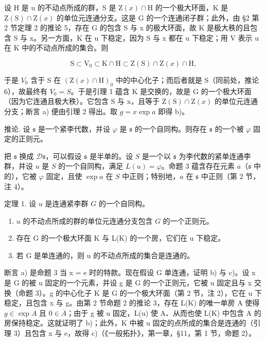 设 H 是 u 的不动点所成的群，S 是 \(\mathrm{Z}(x)\cap\mathrm{H}\) 的一个极大环面，K 是 \(\mathrm{Z}(\mathrm{S})\cap\mathrm{Z}(x)\) 的单位元连通分支。这是 G 的一个连通闭子群；此外，由 §2 第 2 节定理 2 的推论 5，存在 G 的包含 S 与 x 的极大环面，故 K 是极大秩的且包含 S 与 x。另一方面，K 在 u 下稳定，因为 S 与 x 都在 u 下稳定；用 V 表示 u 在 K 中的不动点所成的集合。则

\[
\mathrm{S} \subset \mathrm{V} _ {0} \subset \mathrm{K} \cap \mathrm{H} \subset \mathrm{Z} (\mathrm{S}) \cap \mathrm{Z} (x) \cap \mathrm{H},
\]

于是 \(V_{0}\) 含于 S 在 \((\mathrm{Z}(x)\cap\mathrm{H})_{0}\) 中的中心化子；而后者就是 S（同前处，推论 6），故最终有 \(V_{0}=S\)。于是引理 1 蕴含 K 是交换的，故是 G 的一个极大环面（因为它连通且极大秩）。它包含 S 与 x，且等于 \(\mathrm{Z}(\mathrm{S})\cap\mathrm{Z}(x)\) 的单位元连通分支；断言 a) 便由引理 2 得出。取 \(g=x\exp a\) 即得 b)。

推论. 设 \(\mathfrak{s}\) 是一个紧李代数，并设 \(\varphi\) 是 \(\mathfrak{s}\) 的一个自同构。则存在 \(\mathfrak{s}\) 的一个被 \(\varphi\) 固定的正则元。

把 \(\mathfrak{s}\) 换成 \(\mathcal{D}\mathfrak{s}\)，可以假设 \(\mathfrak{s}\) 是半单的。设 \(S\) 是一个以 \(\mathfrak{s}\) 为李代数的紧单连通李群，并设 \(u\) 是 \(S\) 的一个自同构，满足 \(L(u) = \varphi\)。命题 3 蕴含存在元素 \(a\)（\(\mathfrak{s}\) 中的），它被 \(\varphi\) 固定，且使 \(\exp a\) 在 \(S\) 中正则；特别地，\(a\) 在 \(\mathfrak{s}\) 中正则（第 2 节，注 4）。

定理 1. 设 \(u\) 是连通紧李群 \(G\) 的一个自同构。

\begin{enumerate}
\def\labelenumi{\alph{enumi})}
\item
  \(u\) 的不动点所成的群的单位元连通分支包含 \(G\) 的一个正则元。
\item
  存在 G 的一个极大环面 K 与 L(K) 的一个房，它们在 u 下稳定。
\item
  若 G 是单连通的，则 u 的不动点所成的集合是连通的。
\end{enumerate}

断言 a) 是命题 3 当 x = e 时的特款。现在假设 G 单连通，证明 b) 与 c)。设 x 是 G 的被 u 固定的一个元素，并设 g 是 G 的一个正则元，它被 u 固定且与 x 交换（命题 3）。g 的中心化子 K 是 G 的一个极大环面（第 2 节，注 2），它在 u 下稳定，且包含 x 与 g。由第 2 节命题 2 的推论 3，存在 L(K) 的唯一单房 A 使得 \(g \in \exp A\) 且 \(0 \in \overline{A}\)；由于 g 被 u 固定，L(u) 使 A、从而也使 L(K) 中包含 A 的房保持稳定。这就证明了 b)；此外，K 中被 u 固定的点所成的集合是连通的（引理 3）且包含 x 与 e，故得 c)（《一般拓扑》，第一章，§11，第 1 节，命题 2）。

